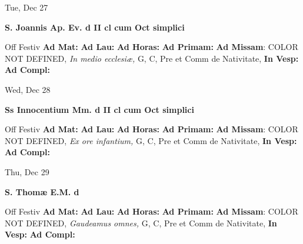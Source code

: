 \documentclass[10pt]{book}
\begin{document}
\begin{center}
\begin{minipage}{3.5in}
\vspace{2em}
\begin{center}Tue, Dec 27
\end{center}
\textbf{ \large S. Joannis Ap. Ev.
\textnormal{\normalsize d II cl cum Oct simplici}}

\begin{justify}Off Festiv
\textbf{Ad Mat: }
\textbf{Ad Lau: }
\textbf{Ad Horas: }
\textbf{Ad Primam: }\textbf{Ad Missam}: COLOR NOT DEFINED, \textit{In medio ecclesiæ,} G, C, Pre et Comm de Nativitate, 
\textbf{In Vesp: }
\textbf{Ad Compl: }
\end{justify}
\end{minipage}
\end{center}

\begin{center}
\begin{minipage}{3.5in}
\vspace{2em}
\begin{center}Wed, Dec 28
\end{center}
\textbf{ \large Ss Innocentium Mm.
\textnormal{\normalsize d II cl cum Oct simplici}}

\begin{justify}Off Festiv
\textbf{Ad Mat: }
\textbf{Ad Lau: }
\textbf{Ad Horas: }
\textbf{Ad Primam: }\textbf{Ad Missam}: COLOR NOT DEFINED, \textit{Ex ore infantium,} G, C, Pre et Comm de Nativitate, 
\textbf{In Vesp: }
\textbf{Ad Compl: }
\end{justify}
\end{minipage}
\end{center}

\begin{center}
\begin{minipage}{3.5in}
\vspace{2em}
\begin{center}Thu, Dec 29
\end{center}
\textbf{ \large S. Thomæ E.M.
\textnormal{\normalsize d}}

\begin{justify}Off Festiv
\textbf{Ad Mat: }
\textbf{Ad Lau: }
\textbf{Ad Horas: }
\textbf{Ad Primam: }\textbf{Ad Missam}: COLOR NOT DEFINED, \textit{Gaudeamus omnes,} G, C, Pre et Comm de Nativitate, 
\textbf{In Vesp: }
\textbf{Ad Compl: }
\end{justify}
\end{minipage}
\end{center}
\end{document}
